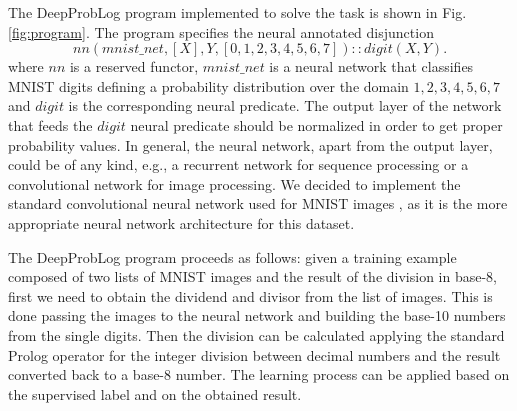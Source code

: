 The DeepProbLog program implemented to solve the task is shown in Fig. \ref{fig:program}. The program specifies the neural annotated disjunction
\begin{equation*}
    nn(mnist\_net,[X],Y,[0,1,2,3,4,5,6,7]) :: digit(X,Y).
\end{equation*}
where $nn$ is a reserved functor, $mnist\_net$ is a neural network that classifies MNIST digits defining a probability distribution over the domain ${1,2,3,4,5,6,7}$ 
and $digit$ is the corresponding neural predicate. The output layer of the network that feeds the $digit$ neural predicate should be normalized in order to get proper probability values. In general, the neural network, apart from the output layer, could be of any kind, e.g., a recurrent network for sequence processing or a convolutional network for image processing. We decided to implement the standard convolutional neural network used for MNIST images \cite{MNIST_CNN}, as it is the more appropriate neural network architecture for this dataset.


The DeepProbLog program proceeds as follows: given a training example composed of two lists of MNIST images and the result of the division in base-8, first we need to obtain the dividend and divisor from the list of images. This is done passing the images to the neural network and building the base-10 numbers from the single digits. Then the division can be calculated applying the standard Prolog operator for the integer division between decimal numbers and the result converted back to a base-8 number. The learning process can be applied based on the supervised label and on the obtained result.





